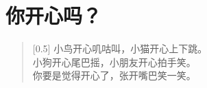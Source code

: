 \documentclass[12pt,UTF-8,openany]{ctexbook}
\begin{document}
\hanzibox{}\hanzibox{}\hanzibox{}\hanzibox{}\hspace{1em}\hanzibox{}\hanzibox{}\hanzibox{}\hanzibox{}

\hanzibox{}\hanzibox{}\hanzibox{}\hanzibox{}\hspace{1em}\hanzibox{}\hanzibox{}\hanzibox{}\hanzibox{}

\hanzibox{}\hanzibox{}\hanzibox{}\hanzibox{}\hspace{1em}\hanzibox{}\hanzibox{}\hanzibox{}\hanzibox{}






\chapter{你开心吗？}

\begin{large}
    
    \begin{verse}[0.5\linewidth]
        小鸟开心叽咕叫，小猫开心上下跳。 \\
        小狗开心尾巴摇，小朋友开心拍手笑。 \\
        你要是觉得开心了，张开嘴巴笑一笑。
    \end{verse}
    
\end{large}


\clearpage

\begin{center}
    
    
\end{center}


\hanzibox{}\hanzibox{}\hanzibox{}\hanzibox{}\hspace{1em}\hanzibox{}\hanzibox{}\hanzibox{}\hanzibox{}

\hanzibox{}\hanzibox{}\hanzibox{}\hanzibox{}\hspace{1em}\hanzibox{}\hanzibox{}\hanzibox{}\hanzibox{}

\hanzibox{}\hanzibox{}\hanzibox{}\hanzibox{}\hspace{1em}\hanzibox{}\hanzibox{}\hanzibox{}\hanzibox{}

\hanzibox{}\hanzibox{}\hanzibox{}\hanzibox{}\hspace{1em}\hanzibox{}\hanzibox{}\hanzibox{}\hanzibox{}
\end{document}
